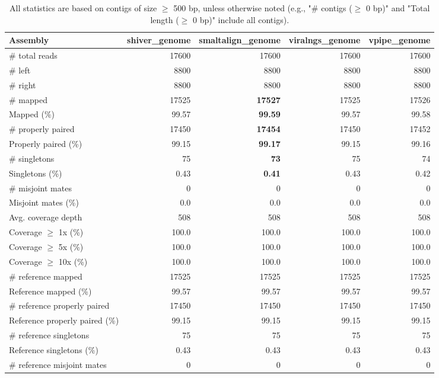 \documentclass[12pt,a4paper]{article}
\begin{document}
\begin{table}[ht]
\begin{center}
\caption{All statistics are based on contigs of size $\geq$ 500 bp, unless otherwise noted (e.g., "\# contigs ($\geq$ 0 bp)" and "Total length ($\geq$ 0 bp)" include all contigs).}
\begin{tabular}{|l*{4}{|r}|}
\hline
Assembly & shiver\_genome & smaltalign\_genome & viralngs\_genome & vpipe\_genome \\ \hline
\# total reads & 17600 & 17600 & 17600 & 17600 \\ \hline
\# left & 8800 & 8800 & 8800 & 8800 \\ \hline
\# right & 8800 & 8800 & 8800 & 8800 \\ \hline
\# mapped & 17525 & {\bf 17527} & 17525 & 17526 \\ \hline
Mapped (\%) & 99.57 & {\bf 99.59} & 99.57 & 99.58 \\ \hline
\# properly paired & 17450 & {\bf 17454} & 17450 & 17452 \\ \hline
Properly paired (\%) & 99.15 & {\bf 99.17} & 99.15 & 99.16 \\ \hline
\# singletons & 75 & {\bf 73} & 75 & 74 \\ \hline
Singletons (\%) & 0.43 & {\bf 0.41} & 0.43 & 0.42 \\ \hline
\# misjoint mates & 0 & 0 & 0 & 0 \\ \hline
Misjoint mates (\%) & 0.0 & 0.0 & 0.0 & 0.0 \\ \hline
Avg. coverage depth & 508 & 508 & 508 & 508 \\ \hline
Coverage $\geq$ 1x (\%) & 100.0 & 100.0 & 100.0 & 100.0 \\ \hline
Coverage $\geq$ 5x (\%) & 100.0 & 100.0 & 100.0 & 100.0 \\ \hline
Coverage $\geq$ 10x (\%) & 100.0 & 100.0 & 100.0 & 100.0 \\ \hline
\# reference mapped & 17525 & 17525 & 17525 & 17525 \\ \hline
Reference mapped (\%) & 99.57 & 99.57 & 99.57 & 99.57 \\ \hline
\# reference properly paired & 17450 & 17450 & 17450 & 17450 \\ \hline
Reference properly paired (\%) & 99.15 & 99.15 & 99.15 & 99.15 \\ \hline
\# reference singletons & 75 & 75 & 75 & 75 \\ \hline
Reference singletons (\%) & 0.43 & 0.43 & 0.43 & 0.43 \\ \hline
\# reference misjoint mates & 0 & 0 & 0 & 0 \\ \hline

\end{tabular}
\end{center}
\end{table}
\end{document}
